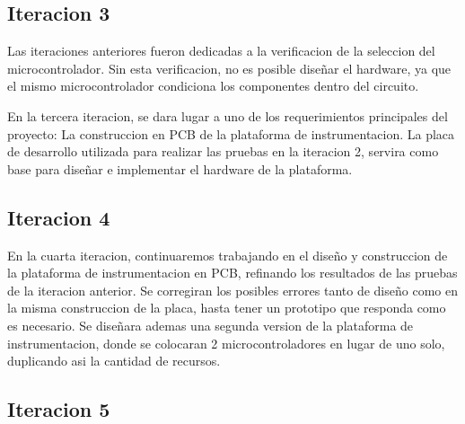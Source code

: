 \subsection{Iteracion 3} %
\label{sub:iteracion_3}

Las iteraciones anteriores fueron dedicadas a la verificacion de la seleccion del microcontrolador. Sin esta verificacion, no es posible diseñar el hardware, ya que el mismo microcontrolador condiciona los componentes dentro del circuito.

En la tercera iteracion, se dara lugar a uno de los requerimientos principales del proyecto: La construccion en PCB de la plataforma de instrumentacion. La placa de desarrollo utilizada para realizar las pruebas en la iteracion 2, servira como base para diseñar e implementar el hardware de la plataforma.

\subsection{Iteracion 4} %
\label{sub:iteracion_4}

En la cuarta iteracion, continuaremos trabajando en el diseño y construccion de la plataforma de instrumentacion en PCB, refinando los resultados de las pruebas de la iteracion anterior. Se corregiran los posibles errores tanto de diseño como en la misma construccion de la placa, hasta tener un prototipo que responda como es necesario.
Se diseñara ademas una segunda version de la plataforma de instrumentacion, donde se colocaran 2 microcontroladores en lugar de uno solo, duplicando asi la cantidad de recursos. 


\subsection{Iteracion 5} %
\label{sub:iteracion_5}

